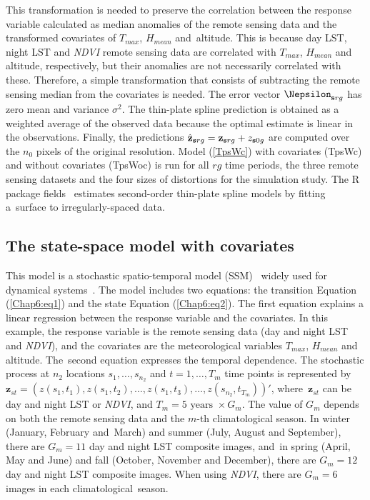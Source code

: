 This transformation is needed to preserve the correlation between the response variable calculated as median anomalies of the remote sensing data and the transformed covariates of $T_{max}$, $H_{mean}$ and~altitude. This is because day LST, night LST and \emph{NDVI} remote sensing data are correlated with $T_{max}$, $H_{mean}$ and altitude, respectively, but their anomalies are not necessarily correlated with these. Therefore, a simple transformation that consists of subtracting the remote sensing median from the covariates is needed.
The error vector $\Nepsilon_{{\bf s}rg}$ has zero mean and variance $\sigma^2$.
The thin-plate spline prediction is obtained as a weighted average of the observed data because the optimal estimate %
is linear in the observations. Finally, the predictions
${\hat{\bf z}_{{\bf s}rg}}={\bf z}_{{\bf s}rg}+z_{{\bf s}0g}$ are computed
over the $n_0$ pixels of the original resolution. Model (\ref{TpsWc}) with covariates (TpsWc) and without covariates (TpsWoc) is run for all $rg$ time periods, the three remote sensing datasets and the four sizes of distortions for the simulation study.
The \textsf{R} package {fields}~\citep{fields} %
estimates second-order thin-plate spline models by fitting a~surface to
irregularly-spaced data.


\subsection{The state-space model with covariates}
\label{Chap6_sec:stem}
 This model is a stochastic spatio-temporal model (SSM)~\citep{durbin2012time} widely used for dynamical systems~\citep[see][]{amisigo2005using,militino2015interpolation,militino2017stochastic}.
 The model includes two equations: the transition Equation (\ref{Chap6:eq1}) and the state Equation (\ref{Chap6:eq2}). The first equation explains a linear regression between the response variable and the covariates. In this example, the response variable is the remote sensing data (day and night LST and \emph{NDVI}), and the covariates are the meteorological variables $T_{max}$, $H_{mean}$ and altitude.
The~second equation expresses the temporal dependence. %
The stochastic process at $n_2$ locations $s_{1},\ldots,s_{n_2}$ and $t=1,\ldots,T_m$ time points is represented
by $\mathbf{z}_{st}=(z(s_{1},t_1),z(s_{1},t_2),\ldots,z(s_{1},t_3),\ldots,z(s_{n_2},t_{T_m}))'$, where~$\mathbf{z}_{st}$ can be day and night LST or \emph{NDVI},
and $T_m=5 \mbox{ years } \times G_m$. The value of $G_m$ depends on both the remote sensing data and the $m$-th climatological season.
In winter (January, February and~March) and summer (July, August and September), there are $G_m=11$ day and night LST composite images, and~in
spring (April, May and June) and fall (October, November and December), there are $G_m=12$ day and night LST composite images.
When using \emph{NDVI}, there are $G_m=6$ images in each climatological~season.

